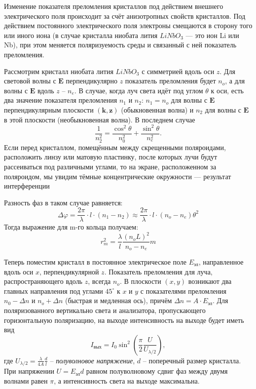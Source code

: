 \documentclass[a4paper,12pt]{article}
\begin{document}
Изменение показателя преломления кристаллов под действием
внешнего электрического поля происходит за счёт анизотропных
свойств кристаллов. Под действием постоянного электрического поля
электроны смещаются в сторону того или иного иона (в случае
кристалла ниобата лития $LiNbO_3$ — это ион Li или Nb), при этом
меняется поляризуемость среды и связанный с ней показатель преломления.

Рассмотрим кристалл ниобата лития $LiNbO_3$ с симметрией вдоль оси $z$. Для световой волны с $\mathbf{E}$ перпендикулярно $z$ показатель преломления будет $n_o$, а для волны с $\mathbf{E}$ вдоль $z$ -- $n_e$. В случае, когда луч света идёт под углом $\theta$ к оси, есть два значение показателя преломления $n_1$ и $n_2$: $n_1 = n_o$ для волны с $\mathbf{E}$ перпендикулярным плоскости $(\mathbf{k},\mathbf{z})$ (обыкновенная волна) и $n_2$ для волны с $\mathbf{E}$ в этой плоскости (необыкновенная волна). В последнем случае
\begin{equation}
\dfrac{1}{n_2^2}=\dfrac{\cos^2 \theta}{n_0^2}+\dfrac{\sin^2 \theta}{n_e^2}.
\end{equation}
Если перед кристаллом, помещённым между скрещенными поляроидами, расположить линзу или матовую пластинку, после которых лучи будут рассеиваться под различными углами, то на экране,
расположенном за поляроидом, мы увидим тёмные концентрические
окружности — результат интерференции

Разность фаз в таком случае равняется:
\begin{equation}
\Delta\varphi=\frac{2\pi}{\lambda}\cdot l\cdot(n_1-n_2)\approx\frac{2\pi}{\lambda}\cdot l\cdot(n_o-n_e)\theta^2
\end{equation}
Тогда выражение для m-го кольца получаем:
\begin{equation}
r^2_{m}=\frac{\lambda}{l}\frac{(n_oL)^2}{n_{o}-n_{e}}m
\label{r}
\end{equation}

Теперь поместим кристалл в постоянное электрическое поле $E_{\text{эл}}$, направленное вдоль оси $x$, перпендикулярной $z$. Показатель преломления для луча, распространяющего вдоль $z$, всегда $n_o$. В плоскости $(x,y)$ возникают два главных направления под углами $45^\circ$ к $x$ и $y$ с показателями преломления $n_0 - \Delta n$ и $n_o + \Delta n$ (быстрая и медленная ось), причём $\Delta n = A\cdot E_{\text{эл}}$. Для поляризованного вертикально света и анализатора, пропускающего горизонтальную поляризацию, на выходе интенсивность на выходе будет иметь вид
\begin{equation}
I_{\text{вых}} = I_0 \sin^2 \left(\dfrac{\pi}{2} \dfrac{U}{U_{\lambda/2}} \right),
\end{equation}
где $U_{\lambda/2} = \frac{\lambda}{4A}\frac{d}{l}$ -- \textit{полуволновое напряжение}, $d$ -- поперечный размер кристалла.  При напряжении $U = E_{\text{эл}}d$ равном полуволновому сдвиг фаз между двумя волнами равен $\pi$, а интенсивность света на выходе максимальна. 
\end{document}

